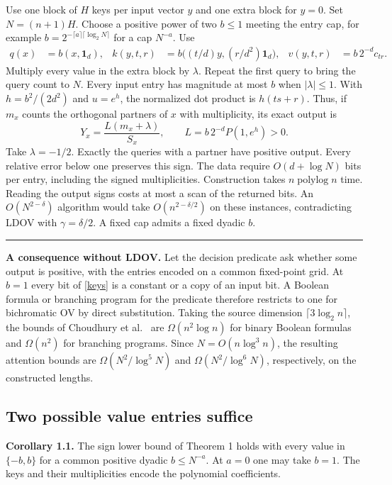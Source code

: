 \documentclass[11pt,letterpaper]{article}
\newcommand{\one}{\mathbf 1}\newcommand{\abs}[1]{\lvert#1\rvert}
\newcommand{\qedmark}{\unskip\nobreak\hfill\rule{0.5em}{0.5em}}
\newcommand{\result}[1]{\smallskip\textbf{#1}\enspace}
\begin{document}
Use one block of $H$ keys per input vector $y$ and one extra block for $y=0$. Set $N=(n+1)H$. Choose a positive power of two $b\le1$ meeting the entry cap, for example $b=2^{-\lceil a\rceil\lceil\log_2 N\rceil}$ for a cap $N^{-a}$. Use
\begin{align}
 q(x)&=b(x,\one_d),&
 k(y,t,r)&=b\big((t/d)y,(r/d^2)\one_d\big),&
 v(y,t,r)&=b\,2^{-d}c_{tr}. \label{keys}
\end{align}
Multiply every value in the extra block by $\lambda$. Repeat the first query to bring the query count to $N$. Every input entry has magnitude at most $b$ when $|\lambda|\le1$. With $h=b^2/(2d^2)$ and $u=e^h$, the normalized dot product is $h(ts+r)$. Thus, if $m_x$ counts the orthogonal partners of $x$ with multiplicity, its exact output is
\begin{equation}
 Y_x=\frac{L(m_x+\lambda)}{S_x},\qquad
 L=b\,2^{-d}P(1,e^h)>0. \label{count}
\end{equation}
Take $\lambda=-1/2$. Exactly the queries with a partner have positive output. Every relative error below one preserves this sign. The data require $O(d+\log N)$ bits per entry, including the signed multiplicities. Construction takes $n\operatorname{polylog}n$ time. Reading the output signs costs at most a scan of the returned bits. An $O(N^{2-\delta})$ algorithm would take $O(n^{2-\delta/2})$ on these instances, contradicting LDOV with $\gamma=\delta/2$. A fixed cap admits a fixed dyadic $b$. \qedmark

\result{A consequence without LDOV.} Let the decision predicate ask whether some output is positive, with the entries encoded on a common fixed-point grid. At $b=1$ every bit of \eqref{keys} is a constant or a copy of an input bit. A Boolean formula or branching program for the predicate therefore restricts to one for bichromatic OV by direct substitution. Taking the source dimension $\lceil3\log_2 n\rceil$, the bounds of Choudhury et al.\ \cite[Theorem 6]{cls} are $\Omega(n^2\log n)$ for binary Boolean formulas and $\Omega(n^2)$ for branching programs. Since $N=O(n\log^3 n)$, the resulting attention bounds are $\Omega(N^2/\log^5 N)$ and $\Omega(N^2/\log^6 N)$, respectively, on the constructed lengths.
\newpage

\subsection*{Two possible value entries suffice}
\result{Corollary 1.1.} The sign lower bound of Theorem 1 holds with every value in $\{-b,b\}$ for a common positive dyadic $b\le N^{-a}$. At $a=0$ one may take $b=1$. The keys and their multiplicities encode the polynomial coefficients.
\end{document}
